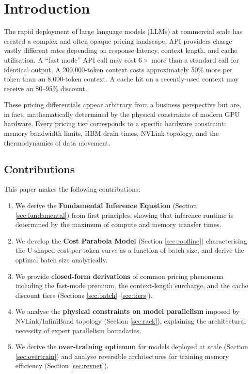 \documentclass[11pt,a4paper]{article}
\begin{document}
\tableofcontents
\newpage

\section{Introduction}
\label{sec:intro}

The rapid deployment of large language models (LLMs) at commercial scale has
created a complex and often opaque pricing landscape. API providers charge
vastly different rates depending on response latency, context length, and
cache utilisation. A ``fast mode'' API call may cost $6\times$ more than a
standard call for identical output. A 200{,}000-token context costs
approximately 50\% more per token than an 8{,}000-token context. A cache hit
on a recently-used context may receive an 80--95\% discount.

These pricing differentials appear arbitrary from a business perspective but
are, in fact, mathematically determined by the physical constraints of modern
GPU hardware. Every pricing tier corresponds to a specific hardware
constraint: memory bandwidth limits, HBM drain times, NVLink topology, and
the thermodynamics of data movement.

\subsection{Contributions}

This paper makes the following contributions:

\begin{enumerate}[leftmargin=*]
  \item We derive the \textbf{Fundamental Inference Equation} (Section
    \ref{sec:fundamental}) from first principles, showing that inference
    runtime is determined by the maximum of compute and memory transfer times.

  \item We develop the \textbf{Cost Parabola Model} (Section \ref{sec:roofline})
    characterising the U-shaped cost-per-token curve as a function of batch
    size, and derive the optimal batch size analytically.

  \item We provide \textbf{closed-form derivations} of common pricing
    phenomena including the fast-mode premium, the context-length surcharge,
    and the cache discount tiers (Sections \ref{sec:batch}--\ref{sec:tiers}).

  \item We analyse the \textbf{physical constraints on model parallelism}
    imposed by NVLink/InfiniBand topology (Section \ref{sec:rack}), explaining
    the architectural necessity of expert parallelism boundaries.

  \item We derive the \textbf{over-training optimum} for models deployed at
    scale (Section \ref{sec:overtrain}) and analyse reversible architectures
    for training memory efficiency (Section \ref{sec:revnet}).
\end{enumerate}
\end{document}
